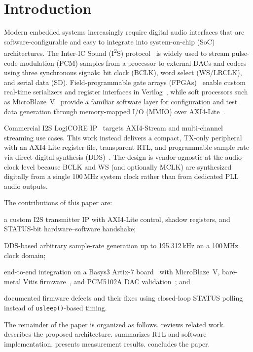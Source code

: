 \section{Introduction}
\label{sec:introduction}

Modern embedded systems increasingly require digital audio interfaces that are software-configurable and easy to integrate into system-on-chip (SoC) architectures.
The Inter-IC Sound (I\textsuperscript{2}S) protocol~\cite{philips_i2s_1986} is widely used to stream pulse-code modulation (PCM) samples from a processor to external DACs and codecs using three synchronous signals: bit clock (BCLK), word select (WS/LRCLK), and serial data (SD).
Field-programmable gate arrays (FPGAs)~\cite{trimberger_history_fpga_2018} enable custom real-time serializers and register interfaces in Verilog~\cite{palnitkar_verilog_2003}, while soft processors such as MicroBlaze~V~\cite{xilinx_microblaze_ref_2021,waterman_riscv_2016} provide a familiar software layer for configuration and test data generation through memory-mapped I/O (MMIO) over AXI4-Lite~\cite{arm_amba_axi_2010}.

Commercial I2S LogiCORE IP~\cite{amd_pg308_i2s_logicore} targets AXI4-Stream and multi-channel streaming use cases.
This work instead delivers a compact, TX-only peripheral with an AXI4-Lite register file, transparent RTL, and programmable sample rate via direct digital synthesis (DDS)~\cite{vankka_dds_2001}.
The design is vendor-agnostic at the audio-clock level because BCLK and WS (and optionally MCLK) are synthesized digitally from a single 100\,MHz system clock rather than from dedicated PLL audio outputs.

The contributions of this paper are:
\begin{compactitem}
  \item a custom I2S transmitter IP with AXI4-Lite control, shadow registers, and STATUS-bit hardware--software handshake;
  \item DDS-based arbitrary sample-rate generation up to 195.312\,kHz on a 100\,MHz clock domain;
  \item end-to-end integration on a Basys3 Artix-7 board~\cite{xilinx_basys3_ref} with MicroBlaze~V, bare-metal Vitis firmware~\cite{xilinx_vitis_embedded_2021}, and PCM5102A DAC validation~\cite{pcm5102a_datasheet}; and
  \item documented firmware defects and their fixes using closed-loop STATUS polling instead of \texttt{usleep()}-based timing.
\end{compactitem}

The remainder of the paper is organized as follows.
 reviews related work.
 describes the proposed architecture.
 summarizes RTL and software implementation.
 presents measurement results.
 concludes the paper.
